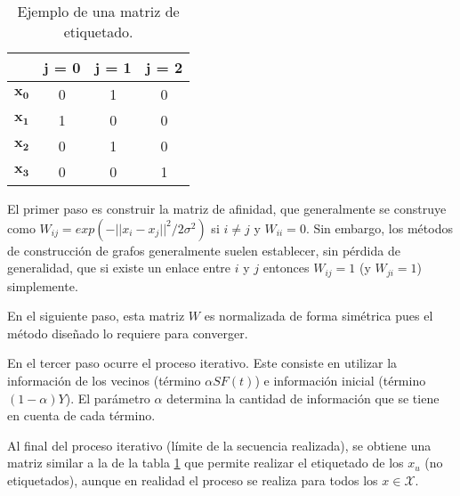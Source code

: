 \begin{table}[h]
\centering
\begin{tabular}{|c|c|c|c|}
\hline
     & \textbf{j = 0} & \textbf{j = 1} & \textbf{j = 2} \\ \hline
$\mathbf{x_0}$ & 0               & 1               & 0               \\ \hline
$\mathbf{x_1}$ & 1               & 0               & 0               \\ \hline
$\mathbf{x_2}$ & 0               & 1               & 0               \\ \hline
$\mathbf{x_3}$ & 0               & 0               & 1               \\ \hline
\end{tabular}
\label{matriz-etiquetado}
\caption{Ejemplo de una matriz de etiquetado.}
\end{table}




El primer paso es construir la matriz de afinidad, que generalmente se construye como $W_{ij} = exp(-||x_i - x_j||^2/2\sigma^2)$ si $i \neq j$ y $W_{ii} = 0$. Sin embargo, los métodos de construcción de grafos generalmente suelen establecer, sin pérdida de generalidad, que si existe un enlace entre $i$ y $j$ entonces $W_{ij} = 1$ (y $W_{ji} = 1$) simplemente.

En el siguiente paso, esta matriz $W$ es normalizada de forma simétrica pues el método diseñado lo requiere para converger.

En el tercer paso ocurre el proceso iterativo. Este consiste en utilizar la información de los vecinos (término $\alpha SF(t)$) e información inicial (término $(1 - \alpha)Y$). El parámetro $\alpha$ determina la cantidad de información que se tiene en cuenta de cada término.

Al final del proceso iterativo (límite de la secuencia realizada), se obtiene una matriz similar a la de la tabla \ref{matriz-etiquetado} que permite realizar el etiquetado de los $x_u$ (no etiquetados), aunque en realidad el proceso se realiza para todos los $x \in \mathcal{X}$.

